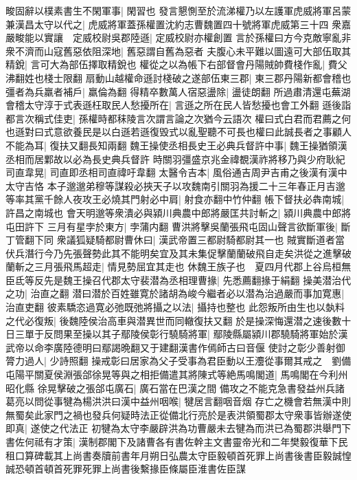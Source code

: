 畯固辭以樸素書生不閑軍事|{
	閑習也}
發言懇惻至於流涕權乃以左護軍虎威將軍呂蒙兼漢昌太守以代之|{
	虎威將軍蓋孫權置沈約志曹魏置四十號將軍虎威第三十四}
衆嘉嚴畯能以實讓　定威校尉吳郡陸遜|{
	定威校尉亦權創置}
言於孫權曰方今克敵寧亂非衆不濟而山寇舊惡依阻深地|{
	舊惡謂自舊為惡者}
夫腹心未平難以圖遠可大部伍取其精銳|{
	言可大為部伍擇取精銳也}
權從之以為帳下右部督會丹陽賊帥費棧作亂|{
	費父沸翻姓也棧士限翻}
扇動山越權命遜討棧破之遂部伍東三郡|{
	東三郡丹陽新都會稽也}
彊者為兵羸者補戶|{
	羸倫為翻}
得精卒數萬人宿惡盪除|{
	盪徒朗翻}
所過肅清還屯蕪湖會稽太守淳于式表遜枉取民人愁擾所在|{
	言遜之所在民人皆愁擾也會工外翻}
遜後詣都言次稱式佳吏|{
	孫權時都秣陵言次謂言論之次猶今云語次}
權曰式白君而君薦之何也遜對曰式意欲養民是以白遜若遜復毁式以亂聖聽不可長也權曰此誠長者之事顧人不能為耳|{
	復扶又翻長知兩翻}
魏王操使丞相長史王必典兵督許中事|{
	魏王操猶領漢丞相而居鄴故以必為長史典兵督許}
時關羽彊盛京兆金禕覩漢祚將移乃與少府耿紀司直韋晃|{
	司直即丞相司直禕吁韋翻}
太醫令吉本|{
	風俗通吉周尹吉甫之後漢有漢中太守吉恪}
本子邈邈弟穆等謀殺必挾天子以攻魏南引關羽為援二十三年春正月吉邈等率其黨千餘人夜攻王必燒其門射必中肩|{
	射食亦翻中竹仲翻}
帳下督扶必犇南城|{
	許昌之南城也}
會天明邈等衆潰必與潁川典農中郎將嚴匡共討斬之|{
	潁川典農中郎將屯田許下}
三月有星孛於東方|{
	孛蒲内翻}
曹洪將擊吳蘭張飛屯固山聲言欲斷軍後|{
	斷丁管翻下同}
衆議狐疑騎都尉曹休曰|{
	漢武帝置三都尉騎都尉其一也}
賊實斷道者當伏兵潛行今乃先張聲勢此其不能明矣宜及其未集促擊蘭蘭破飛自走矣洪從之進擊破蘭斬之三月張飛馬超走|{
	情見勢屈宜其走也}
休魏王族子也　夏四月代郡上谷烏桓無臣氐等反先是魏王操召代郡太守裴潜為丞相理曹掾|{
	先悉薦翻掾于絹翻}
操美潜治代之功|{
	治直之翻}
潜曰潜於百姓雖寛於諸胡為峻今繼者必以潜為治過嚴而事加寛惠|{
	治直吏翻}
彼素驕恣過寛必弛既弛將攝之以法|{
	攝持也整也}
此怨叛所由生也以埶料之代必復叛|{
	後魏陸侯治高車與潜異世而同轍復扶又翻}
於是操深悔還潜之速後數十日三單于反問果至操以其子鄢陵侯彰行驍騎將軍|{
	鄢陵縣屬潁川郡驍騎將軍始於漢武帝以命李廣陸德明曰鄢謁晩翻又于建翻漢書作傿師古曰音偃}
使討之彰少善射御膂力過人|{
	少詩照翻}
操戒彰曰居家為父子受事為君臣動以王灋從事爾其戒之　劉備屯陽平關夏侯淵張郃徐晃等與之相拒備遣其將陳式等絶馬鳴閣道|{
	馬鳴閣在今利州昭化縣}
徐晃擊破之張郃屯廣石|{
	廣石當在巴漢之間}
備攻之不能克急書發益州兵諸葛亮以問從事犍為楊洪洪曰漢中益州咽喉|{
	犍居言翻咽音烟}
存亡之機會若無漢中則無蜀矣此家門之禍也發兵何疑時法正從備北行亮於是表洪領蜀郡太守衆事皆辦遂使即真|{
	遂使之代法正}
初犍為太守李嚴辟洪為功曹嚴未去犍為而洪已為蜀郡洪舉門下書佐何祗有才策|{
	漢制郡閣下及諸曹各有書佐幹主文書靈帝光和二年樊毅復華下民租口算碑載其上尚書奏牘前書年月朔日弘農太守臣毅頓首死罪上尚書後書臣毅誠惶誠恐頓首頓首死罪死罪上尚書後繫掾臣條屬臣淮書佐臣謀}
